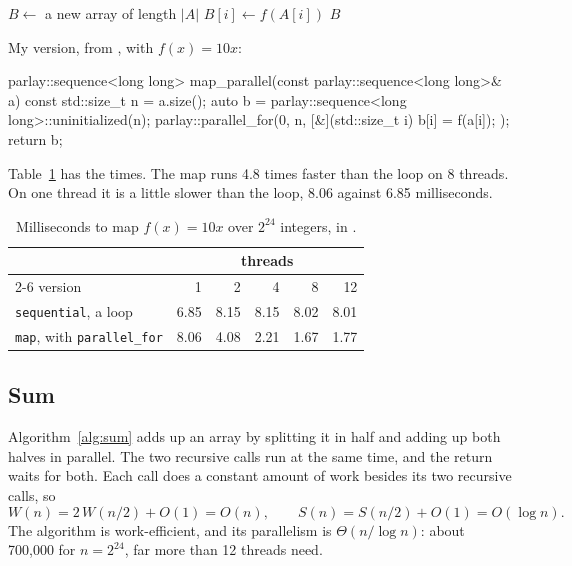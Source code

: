 \begin{algorithm}[H]
  \caption{Map}
  \label{alg:map}
  \begin{algorithmic}
      \State $B \gets$ a new array of length $|A|$
        \State $B[i] \gets f(A[i])$
      \EndParFor
      \State \Return $B$
    \EndFunction
  \end{algorithmic}
\end{algorithm}

My version, from , with $f(x) = 10x$:
\begin{code}
parlay::sequence<long long> map_parallel(const parlay::sequence<long long>& a) {
    const std::size_t n = a.size();
    auto b = parlay::sequence<long long>::uninitialized(n);
    parlay::parallel_for(0, n, [&](std::size_t i) {
        b[i] = f(a[i]);
    });
    return b;
}
\end{code}

Table~\ref{tab:map} has the times. The map runs 4.8 times faster than the loop on 8 threads. On one thread it is a little slower than the loop, 8.06 against 6.85 milliseconds.

\begin{table}[ht]
  \centering
  \small
  \caption{Milliseconds to map $f(x) = 10x$ over $2^{24}$ integers, in .}
  \label{tab:map}
  \begin{tabular}{@{}lrrrrr@{}}
    \toprule
    & \multicolumn{5}{c}{threads} \\
    \cmidrule(l){2-6}
    version & 1 & 2 & 4 & 8 & 12 \\
    \midrule
    \texttt{sequential}, a loop & 6.85 & 8.15 & 8.15 & 8.02 & 8.01 \\
    \texttt{map}, with \texttt{parallel\_for} & 8.06 & 4.08 & 2.21 & 1.67 & 1.77 \\
    \bottomrule
  \end{tabular}
\end{table}

\subsection{Sum}

Algorithm~\ref{alg:sum} adds up an array by splitting it in half and adding up both halves in parallel. The two recursive calls run at the same time, and the return waits for both. Each call does a constant amount of work besides its two recursive calls, so
\[
  W(n) = 2\,W(n/2) + O(1) = O(n), \qquad S(n) = S(n/2) + O(1) = O(\log n).
\]
The algorithm is work-efficient, and its parallelism is $\Theta(n / \log n)$: about 700{,}000 for $n = 2^{24}$, far more than 12 threads need.

